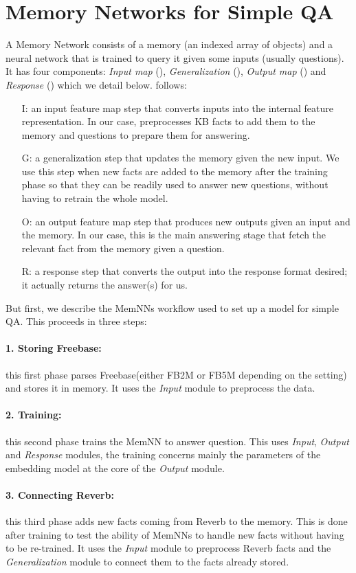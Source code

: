 \documentclass[11pt,a4paper]{article}
\newcommand{\fb}{{\sf Freebase}\xspace}
\newcommand{\rv}{{\sf Reverb}\xspace}
\newcommand{\fbs}{{\sf FB2M}\xspace}
\newcommand{\fbb}{{\sf FB5M}\xspace}
\begin{document}
\section{Memory Networks for Simple QA}
\label{sec:memnn}
A Memory Network consists of a memory (an indexed array of objects)
and a neural network that is trained to query it given some inputs
(usually questions). It has four components: {\it Input map} (), {\it
  Generalization} (), {\it Output map} () and {\it Response} ()
which we detail below.
follows:
\begin{itemize}
\item[I:] an input feature map step that converts inputs into the internal
  feature representation. In our case,  preprocesses KB facts to add
  them to the memory and questions to prepare them for answering.
\item[G:] a generalization step that updates the memory given the new
  input. We use this step when new facts are added to the memory after
  the training phase so that they can be readily used to answer new
  questions, without having to retrain the whole model.
\item[O:] an output feature map step that produces new outputs given
  an input and the memory. In our case, this is the main answering
  stage that fetch the relevant fact from the memory given a question.
\item[R:] a response step that converts the output into the response
  format desired; it actually returns the answer(s) for us.
\end{itemize}
\fi
But first, we describe the MemNNs workflow used to set up a model for
simple QA. This proceeds in three steps:
\paragraph{1. Storing Freebase:} this first phase parses \fb (either \fbs
  or \fbb depending on the setting) and stores it in memory. It uses
  the {\it Input} module to preprocess the data.
\paragraph{2. Training:} this second phase trains the MemNN to answer
  question. This uses {\it Input}, {\it Output} and {\it Response}
  modules, the training concerns mainly the parameters of the
  embedding model at the core of the  {\it Output} module.
\paragraph{3. Connecting Reverb:}this third phase adds new facts coming
  from \rv to the memory. This is done after training to test the
  ability of MemNNs to handle new facts without having to be
  re-trained. It uses the {\it Input} module to preprocess \rv facts and the {\it
    Generalization} module to connect them to the facts already
  stored.
\end{document}
